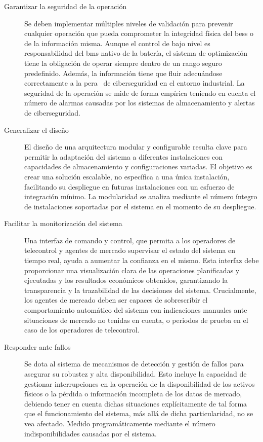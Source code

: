 \begin{description}
  \item[Garantizar la seguridad de la operación] Se deben implementar múltiples niveles de validación para prevenir cualquier operación que pueda comprometer la integridad física del \gls{bess} o de la información misma. Aunque el control de bajo nivel es responsabilidad del \gls{bms} nativo de la batería, el sistema de optimización tiene la obligación de operar siempre dentro de un rango seguro predefinido. Además, la información tiene que fluir adecuándose correctamente a la \gls{pera}~\cite{williams1994purdue} de ciberseguridad en el entorno industrial. La seguridad de la operación se mide de forma empírica teniendo en cuenta el número de alarmas causadas por los sistemas de almacenamiento y alertas de ciberseguridad.

  \item[Generalizar el diseño] El diseño de una arquitectura modular y configurable resulta clave para permitir la adaptación del sistema a diferentes instalaciones con capacidades de almacenamiento y configuraciones variadas. El objetivo es crear una solución escalable, no específica a una única instalación, facilitando su despliegue en futuras instalaciones con un esfuerzo de integración mínimo. La modularidad se analiza mediante el número íntegro de instalaciones soportadas por el sistema en el momento de su despliegue.

  \item[Facilitar la monitorización del sistema] Una interfaz de comando y control, que permita a los operadores de telecontrol y agentes de mercado supervisar el estado del sistema en tiempo real, ayuda a aumentar la confianza en el mismo. Esta interfaz debe proporcionar una visualización clara de las operaciones planificadas y ejecutadas y los resultados económicos obtenidos, garantizando la transparencia y la trazabilidad de las decisiones del sistema. Crucialmente, los agentes de mercado deben ser capaces de sobrescribir el comportamiento automático del sistema con indicaciones manuales ante situaciones de mercado no tenidas en cuenta, o periodos de prueba en el caso de los operadores de telecontrol.

  \item[Responder ante fallos] Se dota al sistema de mecanismos de detección y gestión de fallos para asegurar su robustez y alta disponibilidad. Esto incluye la capacidad de gestionar interrupciones en la operación de la disponibilidad de los activos físicos o la pérdida o información incompleta de los datos de mercado, debiendo tener en cuenta dichas situaciones explícitamente de tal forma que el funcionamiento del sistema, más allá de dicha particularidad, no se vea afectado. Medido programáticamente mediante el número indisponibilidades causadas por el sistema.


\end{description}
